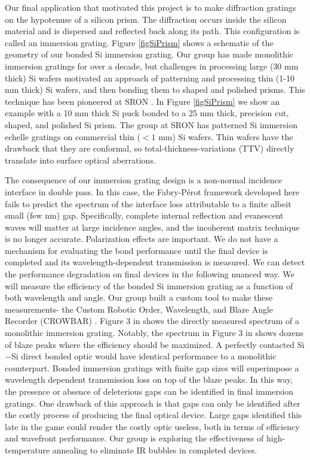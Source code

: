 \documentclass[osajnl,preprint,showpacs,superscriptaddress,12pt]{revtex4-1} %
\begin{document}
Our final application that motivated this project is to make diffraction gratings on the hypotenuse of a silicon prism.  The diffraction occurs inside the silicon material and is dispersed and reflected back along its path.  This configuration is called an immersion grating.  Figure \ref{figSiPrism} shows a schematic of the geometry of our bonded Si immersion grating.  Our group has made monolithic immersion gratings for over a decade, but challenges in processing large (30 mm thick) Si wafers motivated an approach of patterning and processing thin (1-10 mm thick) Si wafers, and then bonding them to shaped and polished prisms.  This technique has been pioneered at SRON \cite{2012SPIE.8450E..2TV}.  In Figure \ref{figSiPrism} we show an example with a 10 mm thick Si puck bonded to a 25 mm thick, precision cut, shaped, and polished Si prism.  The group at SRON has patterned Si immersion echelle gratings on commercial thin  ($< 1$ mm) Si wafers.  Thin wafers have the drawback that they are conformal, so total-thickness-variations (TTV) directly translate into surface optical aberrations\cite{2012SPIE.8450E..2TV}.  

The consequence of our immersion grating design is a non-normal incidence interface in double pass.  In this case, the Fabry-P\'{e}rot framework developed here fails to predict the spectrum of the interface loss attributable to a finite albeit small (few nm) gap.  Specifically, complete internal reflection and evanescent waves will matter at large incidence angles, and the incoherent matrix technique is no longer accurate.  Polarization effects are important.  We do not have a mechanism for evaluating the bond performance until the final device is completed and its wavelength-dependent transmission is measured.  We can detect the performance degradation on final devices in the following nuanced way.  We will measure the efficiency of the bonded Si immersion grating as a function of both wavelength and angle.  Our group built a custom tool to make these measurements- the Custom Robotic Order, Wavelength, and Blaze Angle Recorder (CROWBAR) \cite{2012SPIE.8450E..2SG}.  Figure 3 in \cite{2012SPIE.8450E..2SG} shows the directly measured spectrum of a monolithic immersion grating.  Notably, the spectrum in Figure 3 in \cite{2012SPIE.8450E..2SG}  shows dozens of blaze peaks where the efficiency should be maximized.  A perfectly contacted Si$-$Si direct bonded optic would have identical performance to a monolithic counterpart.  Bonded immersion gratings with finite gap sizes will superimpose a wavelength dependent transmission loss on top of the blaze peaks.  In this way, the presence or absence of deleterious gaps can be identified in final immersion gratings.  One drawback of this approach is that gaps can only be identified after the costly process of producing the final optical device.  Large gaps identified this late in the game could render the costly optic useless, both in terms of efficiency and wavefront performance.  Our group is exploring the effectiveness of high-temperature annealing to eliminate IR bubbles in completed devices.
\end{document}

